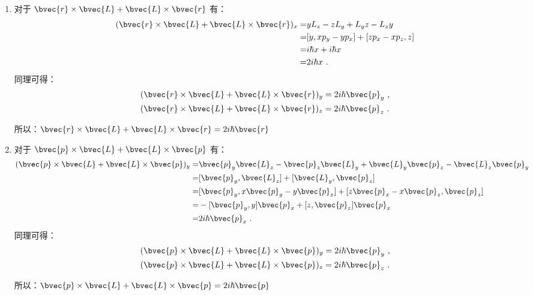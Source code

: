 \begin{enumerate}
\item 对于 $\bvec{r} \times \bvec{L} + \bvec{L} \times \bvec{r} $ 有：
\begin{equation}
\begin{aligned}
(\bvec{r} \times \bvec{L} + \bvec{L} \times \bvec{r})_{x} =& yL_{z}-zL_{y}+L_{y}z-L_{z}y \\
=& [y,xp_{y}-yp_{x}]+[zp_{x}-xp_{z},z] \\
=& i\hbar x + i\hbar x \\
=&2i\hbar x~.
\end{aligned}
\end{equation}
同理可得：\\
\begin{equation}
\begin{aligned}
& (\bvec{r} \times \bvec{L} + \bvec{L} \times \bvec{r})_{y} =2i\hbar \bvec{p}_{y}~, \\
& (\bvec{r} \times \bvec{L} + \bvec{L} \times \bvec{r})_{z} =2i\hbar \bvec{p}_{z}~.
\end{aligned}
\end{equation}

所以：$\bvec{r} \times \bvec{L} + \bvec{L} \times \bvec{r} = 2i\hbar \bvec{r} $
\item 对于 $\bvec{p} \times \bvec{L} + \bvec{L} \times \bvec{p}$ 有：
\begin{equation}
\begin{aligned}
(\bvec{p} \times \bvec{L} + \bvec{L} \times \bvec{p})_{y} =& \bvec{p}_{y} \bvec{L}_{z} - \bvec{p}_{z} \bvec{L}_{y} + \bvec{L}_{y} \bvec{p}_{z} - \bvec{L}_{z} \bvec{p}_{y} \\
=& [\bvec{p}_{y},\bvec{L}_{z}] + [\bvec{L}_{y},\bvec{p}_{z}] \\
=& [\bvec{p}_{y},x\bvec{p}_{y} - y\bvec{p}_{x}] + [z\bvec{p}_{x}-x\bvec{p}_{z},\bvec{p}_{z}] \\
=& -[\bvec{p}_{y},y]\bvec{p}_{x} + [z,\bvec{p}_{z}]\bvec{p}_{x} \\
=& 2i\hbar \bvec{p}_{x}~.
\end{aligned}
\end{equation}
同理可得：\\
\begin{equation}
\begin{aligned}
& (\bvec{p} \times \bvec{L} + \bvec{L} \times \bvec{p})_{y} =2i\hbar \bvec{p}_{y} ~,\\
& (\bvec{p} \times \bvec{L} + \bvec{L} \times \bvec{p})_{z} =2i\hbar \bvec{p}_{z}~.
\end{aligned}
\end{equation}

所以：$\bvec{p} \times \bvec{L} + \bvec{L} \times \bvec{p} = 2i\hbar \bvec{p} $
\end{enumerate}

